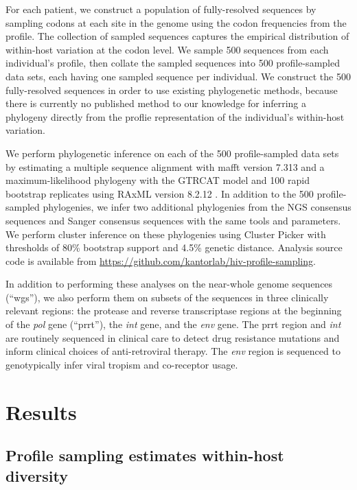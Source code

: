 \documentclass[letterpaper]{article}
\begin{document}
For each patient, we construct a population of fully-resolved sequences by sampling codons at each site in the genome using the codon frequencies from the profile. The collection of sampled sequences captures the empirical distribution of within-host variation at the codon level. We sample 500 sequences from each individual's profile, then collate the sampled sequences into 500 profile-sampled data sets, each having one sampled sequence per individual. We construct the 500 fully-resolved sequences in order to use existing phylogenetic methods, because there is currently no published method to our knowledge for inferring a phylogeny directly from the proflie representation of the individual's within-host variation.

We perform phylogenetic inference on each of the 500 profile-sampled data sets by estimating a multiple sequence alignment with mafft version 7.313 \parencite{katoh} and a maximum-likelihood phylogeny with the GTRCAT model and 100 rapid bootstrap replicates using RAxML version 8.2.12 \parencite{stamatakis}. In addition to the 500 profile-sampled phylogenies, we infer two additional phylogenies from the NGS consensus sequences and Sanger consensus sequences with the same tools and parameters. We perform cluster inference on these phylogenies using Cluster Picker \parencite{ragonnet-cronin} with thresholds of 80\% bootstrap support and 4.5\% genetic distance. Analysis source code is available from \url{https://github.com/kantorlab/hiv-profile-sampling}.

In addition to performing these analyses on the near-whole genome sequences (``wgs''), we also perform them on subsets of the sequences in three clinically relevant regions: the protease and reverse transcriptase regions at the beginning of the \emph{pol} gene (``prrt''), the \emph{int} gene, and the \emph{env} gene. The prrt region and \emph{int} are routinely sequenced in clinical care to detect drug resistance mutations and inform clinical choices of anti-retroviral therapy. The \emph{env} region is sequenced to genotypically infer viral tropism and co-receptor usage.

\section*{Results}

\subsection*{Profile sampling estimates within-host diversity}
\end{document}
